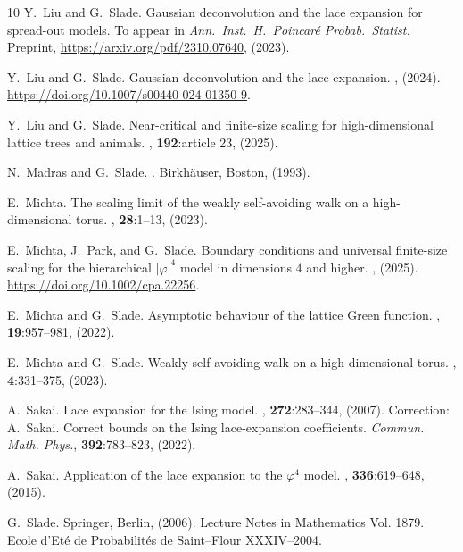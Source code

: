 \documentclass[11pt,hidelinks]{article}
\theoremstyle{plain}
\numberwithin{equation}{section}
\renewcommand{\(}{\left(}
\renewcommand{\)}{\right)}
\newcommand{\1}{\mathds{1}}
\begin{document}
{\begin{thebibliography}{10}
Y.~Liu and G.~Slade.
\newblock Gaussian deconvolution and the lace expansion for spread-out models.
\newblock To appear in {\it Ann.\ Inst.\ H.\ Poincar\'e Probab.\ Statist.}
  Preprint, \url{https://arxiv.org/pdf/2310.07640}, (2023).

Y.~Liu and G.~Slade.
\newblock Gaussian deconvolution and the lace expansion.
, (2024).
\newblock \url{https://doi.org/10.1007/s00440-024-01350-9}.

Y.~Liu and G.~Slade.
\newblock Near-critical and finite-size scaling for high-dimensional lattice
  trees and animals.
, {\bf 192}:article 23, (2025).

N.~Madras and G.~Slade.
.
\newblock Birkh{\"a}user, Boston, (1993).

E.~Michta.
\newblock The scaling limit of the weakly self-avoiding walk on a
  high-dimensional torus.
, {\bf 28}:1--13, (2023).

E.~Michta, J.~Park, and G.~Slade.
\newblock Boundary conditions and universal finite-size scaling for the
  hierarchical $|\varphi|^4$ model in dimensions $4$ and higher.
, (2025).
\newblock \url{https://doi.org/10.1002/cpa.22256}.

E.~Michta and G.~Slade.
\newblock Asymptotic behaviour of the lattice {Green} function.
, {\bf 19}:957--981,
  (2022).

E.~Michta and G.~Slade.
\newblock Weakly self-avoiding walk on a high-dimensional torus.
, {\bf 4}:331--375, (2023).

A.~Sakai.
\newblock Lace expansion for the {Ising} model.
, {\bf 272}:283--344, (2007).
\newblock Correction: A.~Sakai. Correct bounds on the Ising lace-expansion
  coefficients. {\it Commun. Math. Phys.}, {\bf 392}:783--823, (2022).

A.~Sakai.
\newblock Application of the lace expansion to the $\varphi^4$ model.
, {\bf 336}:619--648, (2015).

G.~Slade.
\newblock Springer, Berlin, (2006).
\newblock Lecture Notes in Mathematics Vol. 1879. Ecole d'Et\'{e} de
  Probabilit\'{e}s de Saint--Flour XXXIV--2004.


\end{thebibliography}}
\end{document}
